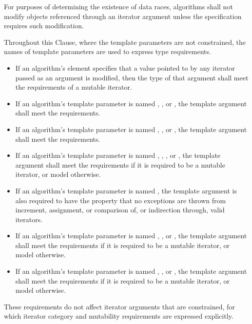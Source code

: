 \pnum
For purposes of determining the existence of data races,
algorithms shall not modify objects referenced through an iterator argument
unless the specification requires such modification.

\pnum
Throughout this Clause, where the template parameters are not constrained,
the names of template parameters are used to express type requirements.
\begin{itemize}
\item
  If an algorithm's  element specifies
  that a value pointed to by any iterator passed as an argument is modified,
  then the type of that argument shall meet
  the requirements of a mutable iterator.
\item
  If an algorithm's template parameter is named
  ,
  , or
  ,
  the template argument shall meet the
   requirements.
\item
  If an algorithm's template parameter is named
  ,
  , or
  ,
  the template argument shall meet the
   requirements.
\item
  If an algorithm's template parameter is named
  ,
  ,
  , or
  ,
  the template argument shall meet the
   requirements
  if it is required to be a mutable iterator, or
  model  otherwise.
\item
  If an algorithm's template parameter is named
  ,
  the template argument
  is also required to have the property that no exceptions are thrown
  from increment, assignment, or comparison of, or
  indirection through, valid iterators.
\item
  If an algorithm's template parameter is named
  ,
  , or
  ,
  the template argument shall meet the
   requirements
  if it is required to be a mutable iterator, or model
   otherwise.
\item
  If an algorithm's template parameter is named
  ,
  , or
  ,
  the template argument shall meet the
   requirements
  if it is required to be a mutable iterator, or model
   otherwise.
\end{itemize}
\begin{note}
These requirements do not affect iterator arguments that are constrained,
for which iterator category and mutability requirements
are expressed explicitly.
\end{note}

